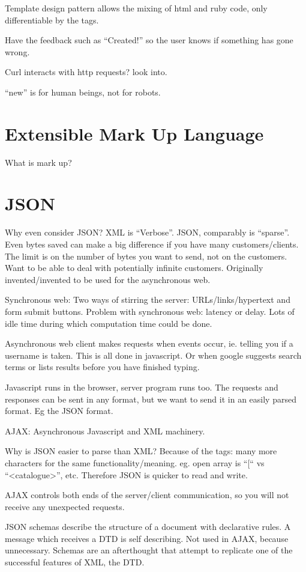 \documentclass[11pt]{article}
\begin{document}
Template design pattern allows the mixing of html and ruby code, only differentiable by the tags.

Have the feedback such as “Created!” so the user knows if something has gone wrong.

Curl interacts with http requests? look into.

“new” is for human beings, not for robots.

\section{Extensible Mark Up Language}

What is mark up?

\section{JSON}

Why even consider JSON? XML is “Verbose”. JSON, comparably is “sparse”. Even bytes saved can make a big difference if you have many customers/clients. The limit is on the number of bytes you want to send, not on the customers. Want to be able to deal with potentially infinite customers. Originally invented/invented to be used for the asynchronous web.

Synchronous web:
Two ways of stirring the server: URLs/links/hypertext and form submit buttons.
Problem with synchronous web: latency or delay. Lots of idle time during which computation time could be done.

Asynchronous web
client makes requests when events occur, ie. telling you if a username is taken. This is all done in javascript. Or when google suggests search terms or lists results before you have finished typing.

Javascript runs in the browser, server program runs too. The requests and responses can be sent in any format, but we want to send it in an easily parsed format. Eg the JSON format.

AJAX: Asynchronous Javascript and XML machinery.

Why is JSON easier to parse than XML? Because of the tags: many more characters for the same functionality/meaning. eg. open array is “[“ vs “<catalogue>”, etc. Therefore JSON is quicker to read and write.

AJAX controls both ends of the server/client communication, so you will not receive any unexpected requests.

JSON schemas describe the structure of a document with declarative rules. A message which receives a DTD is self describing. Not used in AJAX, because unnecessary. Schemas are an afterthought that attempt to replicate one of the successful features of XML, the DTD.
\end{document}
